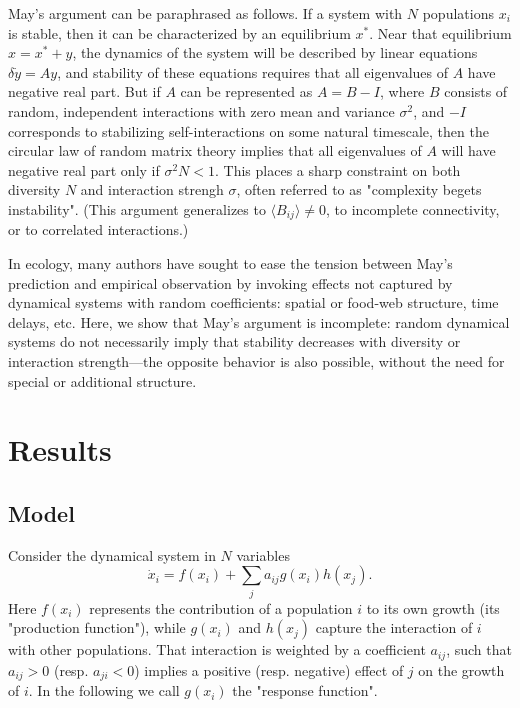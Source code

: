 \documentclass[%
 reprint,
 amsmath,amssymb,
 aps,
]{revtex4-2}
\begin{document}
May's argument can be paraphrased as follows. If a system with $N$ populations $x_i$ is stable, then it can be characterized by an equilibrium $x^*$. Near that equilibrium $x = x^* + y$, the dynamics of the system will be described by linear equations $\delta\dot{y} = A y$, and stability of these equations requires that all eigenvalues of $A$ have negative real part. But if $A$ can be represented as $A = B - I$, where $B$ consists of random, independent interactions with zero mean and variance $\sigma^2$, and $-I$ corresponds to stabilizing self-interactions on some natural timescale, then the circular law of random matrix theory implies that all eigenvalues of $A$ will have negative real part only if $\sigma^2 N < 1$. This places a sharp constraint on both diversity $N$ and interaction strengh $\sigma$, often referred to as "complexity begets instability". (This argument generalizes to $\langle B_{ij}\rangle \neq 0$, to incomplete connectivity, or to correlated interactions.)

In ecology, many authors have sought to ease the tension between May's prediction and empirical observation by invoking effects not captured by dynamical systems with random coefficients: spatial or food-web structure, time delays, etc. Here, we show that May's argument is incomplete: random dynamical systems do not necessarily imply that stability decreases with diversity or interaction strength---the opposite behavior is also possible, without the need for special or additional structure. 

\section{Results}

\subsection{Model}

Consider the dynamical system in $N$ variables
\begin{equation}\label{dynamics}
    \dot{x}_i = f(x_i) + \sum_{j}a_{ij}g(x_i)h(x_j).
\end{equation}
Here $f(x_i)$ represents the contribution of a population $i$ to its own growth (its "production function"), while $g(x_i)$ and $h(x_j)$ capture the interaction of $i$ with other populations. That interaction is weighted by a coefficient $a_{ij}$, such that $a_{ij} > 0$ (resp. $a_{ji} < 0$) implies a positive (resp. negative) effect of $j$ on the growth of $i$. In the following we call $g(x_i)$ the "response function". 
\end{document}
